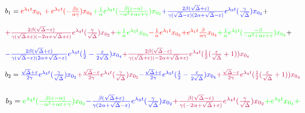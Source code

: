 \begin{tiny}
\begin{displaymath}
\begin{array}{l}
b_{1}={\color{red}e^{\lambda_{1}t}x_{0_{1}}+e^{\lambda_{1}t}(-\frac{\beta\varepsilon}{\alpha\gamma})x_{0_{2}}}{\color{green}+\frac{1}{\alpha}e^{\lambda_{2}t}(\frac{\beta(\varepsilon-\alpha)}{-\alpha^{2}+\alpha\varepsilon+\gamma})x_{0_{2}}}{\color{blue}+\frac{2\beta(\sqrt{\Delta}+\varepsilon)}{\gamma(\sqrt{\Delta}-\varepsilon)(2\alpha+\sqrt{\Delta}-\varepsilon)}e^{\lambda_{3}t}(\frac{\gamma}{\sqrt{\Delta}})x_{0_{2}}} \color{black}+\\ \\ {\color{purple}+ \frac{2\beta(\sqrt{\Delta}-\varepsilon)}{\gamma(\sqrt{\Delta}+\varepsilon)(-2\alpha+\sqrt{\Delta}+\varepsilon)}e^{\lambda_{4}t}(\frac{\gamma}{\sqrt{\Delta}})x_{0_{2}}+} 
{\color{green}+\frac{1}{\alpha}e^{\lambda_{2}t}x_{0_{3}}}{\color{red}-\frac{1}{\alpha}e^{\lambda_{1}t}x_{0_{3}}}{\color{red}+e^{\lambda_{1}t}\frac{\beta}{\alpha\gamma}x_{0_{4}}}{\color{green}+\frac{1}{\alpha}e^{\lambda_{2}t}(\frac{-\beta}{- \alpha^{2}+\alpha\varepsilon+\gamma})x_{0_{4}}} + \\ \\ {\color{blue}-\frac{2\beta(\sqrt{\Delta}+\varepsilon)}{\gamma(\sqrt{\Delta}-\varepsilon)(2\alpha+\sqrt{\Delta}-\varepsilon)}e^{\lambda_{3}t}(\frac{1}{2}-\frac{\varepsilon}{2\sqrt{\Delta}})x_{0_{4}}}{\color{purple}+\frac{2\beta(\sqrt{\Delta}-\varepsilon)}{\gamma(\sqrt{\Delta}+\varepsilon)(-2\alpha+\sqrt{\Delta}+\varepsilon)}e^{\lambda_{4}t}(\frac{1}{2}(\frac{\varepsilon}{\sqrt{\Delta}}+1))x_{0_{4}}} \\ \\
b_{2}={\color{blue}\frac{\sqrt{\Delta}+\varepsilon}{2\gamma}e^{\lambda_{3}t}(\frac{\gamma}{\sqrt{\Delta}})x_{0_{2}}}{\color{purple}+\frac{\sqrt{\Delta}-\varepsilon}{2\gamma}e^{\lambda_{4}t}(\frac{\gamma}{\sqrt{\Delta}})x_{0_{2}}}{\color{blue}-\frac{\sqrt{\Delta}+\varepsilon}{2\gamma}e^{\lambda_{3}t}(\frac{1}{2}-\frac{\varepsilon}{2\sqrt{\Delta}})x_{0_{4}}}{\color{purple}+\frac{\sqrt{\Delta}-\varepsilon}{2\gamma}e^{\lambda_{4}t}(\frac{1}{2}(\frac{\varepsilon}{\sqrt{\Delta}}+1))x_{0_{4}}} \\ \\
\end{array}
\end{displaymath}
\begin{displaymath}
\begin{array}{l}
b_{3}={\color{green}e^{\lambda_{2}t}(\frac{\beta(\varepsilon-\alpha)}{-\alpha^{2}+\alpha\varepsilon+\gamma})x_{0_{2}}}{\color{blue}-\frac{\beta(\sqrt{\Delta}+\varepsilon)}{\gamma(2\alpha+\sqrt{\Delta}-\varepsilon)}e^{\lambda_{3}t}(\frac{\gamma}{\sqrt{\Delta}})x_{0_{2}}}{\color{purple}+\frac{\beta(\sqrt{\Delta}-\varepsilon)}{\gamma(-2\alpha+\sqrt{\Delta}+\varepsilon)}e^{\lambda_{4}t}(\frac{\gamma}{\sqrt{\Delta}})x_{0_{2}}}{\color{green}+e^{\lambda_{2}t}x_{0_{3}}}{\color{green}+} \\ \\

\end{array}
\end{displaymath}
\end{tiny}

